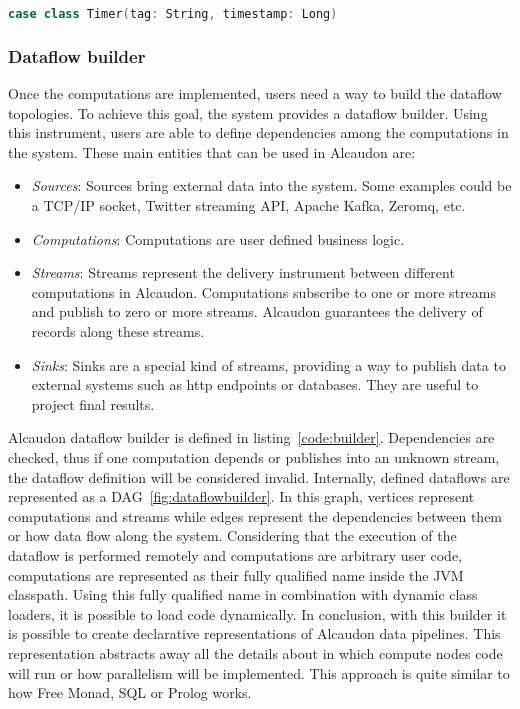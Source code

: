 \begin{lstlisting}[language=scala, frame=trBL, label=code:timers, float=ht, caption = {Timer class}]
  case class Timer(tag: String, timestamp: Long)
\end{lstlisting}

\subsubsection{Dataflow builder}

Once the computations are implemented, users need a way to build the dataflow topologies.
To achieve this goal, the system provides a dataflow builder. Using this instrument,
users are able to define dependencies among the computations in the system.
These main entities that can be used in Alcaudon are:

\begin{itemize}
  \item \textit{Sources}: Sources bring external data into the system. Some
    examples could be a TCP/IP socket, Twitter streaming API, Apache Kafka,
    Zeromq, etc.
  \item \textit{Computations}: Computations are user defined business logic.
  \item \textit{Streams}: Streams represent the delivery instrument between
    different computations in Alcaudon. Computations subscribe to one or more
    streams and publish to zero or more streams. Alcaudon guarantees the
    delivery of records along these streams.
  \item \textit{Sinks}: Sinks are a special kind of streams, providing a way to
    publish data to external systems such as http endpoints or databases. They
    are useful to project final results.
\end{itemize}

Alcaudon dataflow builder is defined in listing~\ref{code:builder}. Dependencies
are checked, thus if one computation depends or publishes into an unknown stream,
the dataflow definition will be considered invalid. Internally, defined
dataflows are represented as a \acf{DAG}~\ref{fig:dataflowbuilder}. In this graph, vertices
represent computations and streams while edges represent the dependencies
between them or how data flow along the system. Considering that the execution
of the dataflow is performed remotely and computations are arbitrary user code,
computations are represented as their fully qualified name inside the \acs{JVM}
classpath. Using this fully qualified name in combination with dynamic class
loaders, it is possible to load code dynamically. In conclusion, with this builder
it is possible to create declarative representations of Alcaudon data pipelines.
This representation abstracts away all the details about in which compute nodes
code will run or how parallelism will be implemented. This approach is quite
similar to how Free Monad\cite{freemonad}, SQL or Prolog works.

